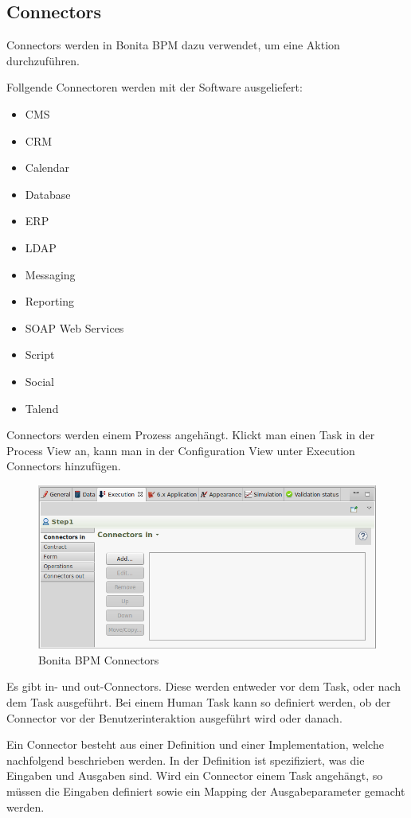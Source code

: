 \subsection{Connectors}
\label{sec:analyse:bonita:connectors}
Connectors werden in Bonita BPM dazu verwendet, um eine Aktion durchzuführen. 

Follgende Connectoren werden mit der Software ausgeliefert:
\begin{itemize}
\item CMS
\item CRM
\item Calendar
\item Database
\item ERP
\item LDAP
\item Messaging
\item Reporting
\item SOAP Web Services
\item Script
\item Social
\item Talend
\end{itemize}

Connectors werden einem Prozess angehängt. Klickt man einen Task in der Process View an, kann man in der Configuration View unter Execution Connectors hinzufügen.
\begin{figure}[H]
	\centering
	\includegraphics[width=1\textwidth]{images/bonita-connectors.png}
	\caption{Bonita BPM Connectors}
	\label{fig:analyse:bonita:connectors}
\end{figure}
Es gibt in- und out-Connectors. Diese werden entweder vor dem Task, oder nach dem Task ausgeführt. Bei einem Human Task kann so definiert werden, ob der Connector vor der Benutzerinteraktion ausgeführt wird oder danach.

Ein Connector besteht aus einer Definition und einer Implementation, welche nachfolgend beschrieben werden. In der Definition ist spezifiziert, was die Eingaben und Ausgaben sind. Wird ein Connector einem Task angehängt, so müssen die Eingaben definiert sowie ein Mapping der Ausgabeparameter gemacht werden.

